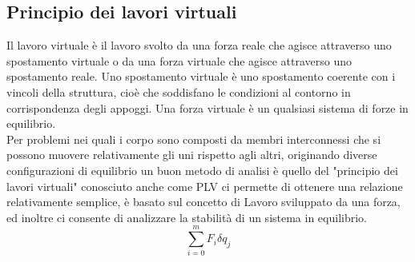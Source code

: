 \subsection{Principio dei lavori virtuali}
Il lavoro virtuale è il lavoro svolto da una forza reale che agisce attraverso uno spostamento virtuale o da una forza virtuale che agisce attraverso uno spostamento reale.
Uno spostamento virtuale è uno spostamento coerente con i vincoli della struttura, cioè che soddisfano le condizioni al contorno in corrispondenza degli appoggi.
Una forza virtuale è un qualsiasi sistema di forze in equilibrio.
\\Per problemi nei quali i corpo sono composti da membri interconnessi che si possono muovere relativamente gli uni rispetto agli altri, originando diverse configurazioni di equilibrio un buon metodo di analisi è quello del "principio dei lavori virtuali" conosciuto anche come PLV ci permette di ottenere una relazione relativamente semplice, è basato sul concetto di Lavoro sviluppato da una forza, ed inoltre ci consente di analizzare la stabilità di un sistema in equilibrio.
\begin{equation}
    \sum_{i=0}^m F_i\delta q_j
\end{equation}
